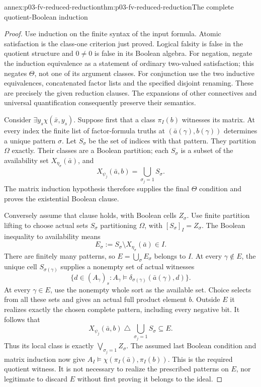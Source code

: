 \begin{annexitem}{annex:p03-fv-reduced-reduction}{thm:p03-fv-reduced-reduction}{The complete quotient-Boolean induction}
\begin{proof}
Use induction on the finite syntax of the input formula. Atomic satisfaction
is the class-one criterion just proved. Logical falsity is false in the
quotient structure and \(0\ne0\) is false in its Boolean algebra.
For negation, negate the induction equivalence as a statement of ordinary
two-valued satisfaction; this negates \(\Theta\), not one of its argument
classes. For conjunction use the two inductive equivalences, concatenated
factor lists and the specified disjoint renaming. These are precisely the
given reduction clauses. The expansions of other connectives and universal
quantification consequently preserve their semantics.

Consider \(\exists y_s\chi(\bar x,y_s)\). Suppose first that a class
\(\pi_I(b)\) witnesses its matrix. At every index the finite list of
factor-formula truths at \((\bar a(\gamma),b(\gamma))\) determines a
unique pattern \(\sigma\). Let \(S_\sigma\) be the set of indices
with that pattern. They partition \(\Omega\) exactly. Their classes
are a Boolean partition; each \(S_\sigma\) is a subset of the availability
set \(X_{\eta_\sigma}(\bar a)\), and
\[
 X_{\psi_j}(\bar a,b)=\bigcup_{\sigma_j=1}S_\sigma.
\]
The matrix induction hypothesis therefore supplies the final \(\Theta\)
condition and proves the existential Boolean clause.

Conversely assume that clause holds, with Boolean cells \(Z_\sigma\).
Use finite partition lifting to choose actual sets \(S_\sigma\)
partitioning \(\Omega\), with \([S_\sigma]_I=Z_\sigma\).
The Boolean inequality to availability means
\[
 E_\sigma:=S_\sigma\setminus X_{\eta_\sigma}(\bar a)\in I.
\]
There are finitely many patterns, so \(E=\bigcup_\sigma E_\sigma\)
belongs to \(I\). At every \(\gamma\notin E\), the unique cell
\(S_{\sigma(\gamma)}\) supplies a nonempty set of actual witnesses
\[
 \{d\in(A_\gamma)_s:
       A_\gamma\models\delta_{\sigma(\gamma)}(\bar a(\gamma),d)\}.
\]
At every \(\gamma\in E\), use the nonempty whole sort as the available
set. Choice selects from all these sets and gives an actual full product
element \(b\). Outside \(E\) it realizes exactly the chosen complete
pattern, including every negative bit. It follows that
\[
 X_{\psi_j}(\bar a,b)\mathbin{\triangle}
                \bigcup_{\sigma_j=1}S_\sigma\subseteq E.
\]
Thus its local class is exactly \(\bigvee_{\sigma_j=1}Z_\sigma\).
The assumed last Boolean condition and matrix induction now give
\(A_I\models\chi(\pi_I(\bar a),\pi_I(b))\). This is the required
quotient witness. It is not necessary to realize the prescribed patterns
on \(E\), nor legitimate to discard \(E\) without first proving it
belongs to the ideal.


\end{proof}
\end{annexitem}
